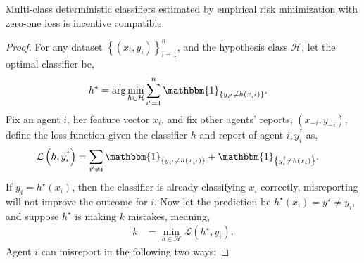 \documentclass{article}
\begin{document}
\begin{prop} \label{prop:zolog} 
Multi-class deterministic classifiers estimated by empirical risk minimization with zero-one loss is incentive compatible.
\end{prop}
\begin{proof} \label{proof:zologpf} 
For any dataset $\left\{\left(x_{i}, y_{i}\right)\right\}_{i=1}^{n}$, and the hypothesis class $\mathcal{H}$, let the optimal classifier be,
\begin{align*}
h^\star  &= \arg\displaystyle\min_{h \in \mathcal{H}} \displaystyle\sum_{i'=1}^{n} \mathbbm{1}_{\left\{y_{i'} \neq  h\left(x_{i'}\right)\right\}}.
\end{align*}
Fix an agent $i $, her feature vector $x_{i}$, and fix other agents' reports, $\left(x_{-i}, y_{-i}\right)$, define the loss function given the classifier $h $ and report of agent $i , y^{\dagger}_{i}$ as,
\begin{align*}
\mathcal{L}\left(h, y^{\dagger}_{i}\right) &= \displaystyle\sum_{i' \neq  i} \mathbbm{1}_{\left\{y_{i'} \neq  h\left(x_{i'}\right)\right\}} + \mathbbm{1}_{\left\{y^{\dagger}_{i} \neq  h\left(x_{i}\right)\right\}}.
\end{align*}
If $y_{i} = h^\star \left(x_{i}\right)$, then the classifier is already classifying $x_{i}$ correctly, misreporting will not improve the outcome for $i $. Now let the prediction be $h^\star \left(x_{i}\right) = y^\star  \neq  y_{i}$, and suppose $h^\star $ is making $k $ mistakes, meaning,
\begin{align*}
k  &= \displaystyle\min_{h \in \mathcal{H}} \mathcal{L}\left(h^\star , y_{i}\right).
\end{align*}
Agent $i $ can misreport in the following two ways:
\end{proof}
\end{document}
